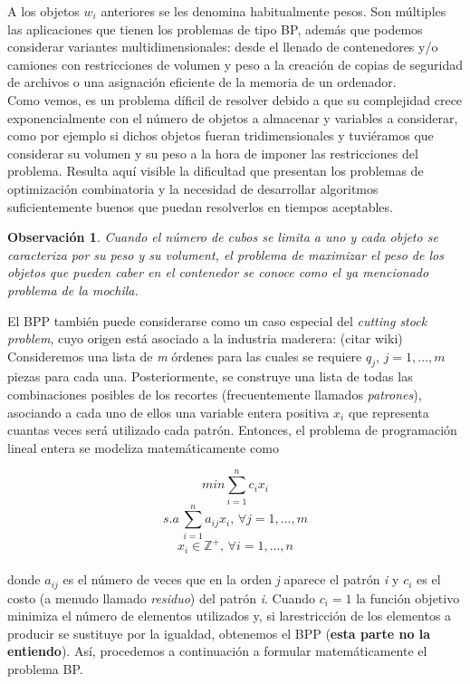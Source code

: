 \documentclass[a4paper, 12pt, oneside]{book}
\newtheorem{observacion}{Observaci\'on}[chapter]
\begin{document}
	A los objetos $w_{i}$ anteriores se les denomina habitualmente pesos. Son m\'ultiples las aplicaciones que tienen los problemas de tipo BP, adem\'as que podemos considerar variantes multidimensionales: desde el llenado de contenedores y/o camiones con restricciones de volumen y peso a la creaci\'on de copias de seguridad de archivos o una asignaci\'on eficiente de la memoria de un ordenador. 
	\\
	
	Como vemos, es un problema d\'ificil de resolver debido a que su complejidad crece exponencialmente con el n\'umero de objetos a almacenar y variables a considerar, como por ejemplo si dichos objetos fueran tridimensionales y tuvi\'eramos que considerar su volumen y su peso a la hora de imponer las restricciones del problema. Resulta aqu\'i visible la dificultad que presentan los problemas de optimizaci\'on combinatoria y la necesidad de desarrollar algoritmos suficientemente buenos que puedan resolverlos en tiempos aceptables.
	
	\begin{observacion}
		Cuando el n\'umero de cubos se limita a uno y cada objeto se caracteriza por su peso y su volument, el problema de maximizar el peso de los objetos que pueden caber en el contenedor se conoce como el  ya mencionado problema de la mochila.
	\end{observacion}
	
	El BPP tambi\'en puede considerarse como un caso especial del \textit{cutting stock problem}, cuyo origen est\'a asociado a la industria maderera: (citar wiki)
	\\
	
	Consideremos una lista de \textit{m} \'ordenes para las cuales se requiere $q_{j}$, $j = 1,...,m$ piezas para cada una. Posteriormente, se construye una lista de todas las combinaciones posibles de los recortes (frecuentemente llamados \textit{patrones}), asociando a cada uno de ellos una variable entera positiva $x_{i}$ que representa cuantas veces ser\'a utilizado cada patr\'on. Entonces, el problema de programaci\'on lineal entera se modeliza matem\'aticamente como
	\newpage
	
	$$ min \sum_{i=1}^{n}c_{i}x_{i} $$
	$$ s.a\, \sum_{i=1}^{n}a_{ij}x_{i},\, \forall j=1,...,m $$
	$$ x_{i}\in \mathbb{Z^{+}},\, \forall i=1,...,n $$
	\\
	donde $a_{ij}$ es el n\'umero de veces que en la orden \textit{j} aparece el patr\'on \textit{i} y $c_{i}$ es el costo (a menudo llamado \textit{residuo}) del patr\'on \textit{i}. Cuando $c_{i} = 1$ la funci\'on objetivo minimiza el n\'umero de elementos utilizados y, si larestricci\'on de los elementos a producir se sustituye por la igualdad, obtenemos el BPP (\textbf{esta parte no la entiendo}). As\'i, procedemos a continuaci\'on a formular matem\'aticamente el problema BP.
	\\
	
\end{document}
